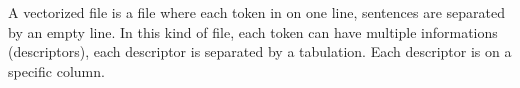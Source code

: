 \documentclass[manual-fr.tex]{subfiles}
\begin{document}
A vectorized file is a file where each token in on one line, sentences are separated by an empty line. In this kind of file, each token can have multiple informations (descriptors), each descriptor is separated by a tabulation. Each descriptor is on a specific column.
\end{document}
